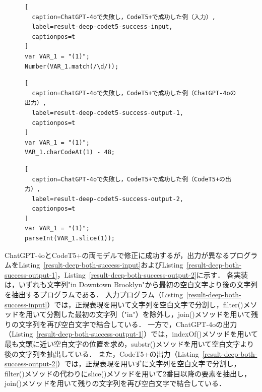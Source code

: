 \documentclass[11pt]{jreport}
\begin{document}
\begin{figure}[t]
\captionsetup{name=Listing}
\hspace{0.04\columnwidth}
\begin{minipage}[b]{0.96\linewidth}
\begin{lstlisting}[
  caption=ChatGPT-4oで失敗し，CodeT5+で成功した例（入力）,
  label=result-deep-codet5-success-input,
  captionpos=t
]
var VAR_1 = "(1)";
Number(VAR_1.match(/\d/));
\end{lstlisting}
\end{minipage}

\hspace{0.04\columnwidth}
\begin{minipage}[b]{0.96\linewidth}
\begin{lstlisting}[
  caption=ChatGPT-4oで失敗し，CodeT5+で成功した例（ChatGPT-4oの出力）,
  label=result-deep-codet5-success-output-1,
  captionpos=t
]
var VAR_1 = "(1)";
VAR_1.charCodeAt(1) - 48;
\end{lstlisting}
\end{minipage}

\hspace{0.04\columnwidth}
\begin{minipage}[b]{0.96\linewidth}
\begin{lstlisting}[
  caption=ChatGPT-4oで失敗し，CodeT5+で成功した例（CodeT5+の出力）,
  label=result-deep-codet5-success-output-2,
  captionpos=t
]
var VAR_1 = "(1)";
parseInt(VAR_1.slice(1));
\end{lstlisting}
\end{minipage}
\end{figure}


ChatGPT-4oとCodeT5+の両モデルで修正に成功するが，出力が異なるプログラムをListing~\ref{result-deep-both-success-input}およびListing~\ref{result-deep-both-success-output-1}，Listing~\ref{result-deep-both-success-output-2}に示す．
各実装は，いずれも文字列"in Downtown Brooklyn"から最初の空白文字より後の文字列を抽出するプログラムである．
入力プログラム（Listing~\ref{result-deep-both-success-input}）では，正規表現を用いて文字列を空白文字で分割し，filter()メソッドを用いて分割した最初の文字列（"in"）を除外し，join()メソッドを用いて残りの文字列を再び空白文字で結合している．
一方で，ChatGPT-4oの出力（Listing~\ref{result-deep-both-success-output-1}）では，indexOf()メソッドを用いて最も文頭に近い空白文字の位置を求め，substr()メソッドを用いて空白文字より後の文字列を抽出している．
また，CodeT5+の出力（Listing~\ref{result-deep-both-success-output-2}）では，正規表現を用いずに文字列を空白文字で分割し，filter()メソッドの代わりにslice()メソッドを用いて2番目以降の要素を抽出し，join()メソッドを用いて残りの文字列を再び空白文字で結合している．
\end{document}
